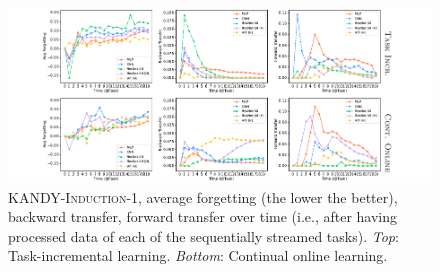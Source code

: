 \begin{figure}

	\centering
	\includegraphics[width=1.0\textwidth]{imgs/kandy/Fig9.pdf}
	\caption[Average forgetting over time on \textsc{KANDY-Induction-1}]{\textsc{KANDY-Induction-1}, average forgetting (the lower the better), backward transfer, forward transfer over time (i.e., after having processed data of each of the sequentially streamed tasks). {\it Top}: Task-incremental learning. {\it Bottom}: Continual online learning.}
	\label{kandy:fig:time_easy}
\end{figure}


